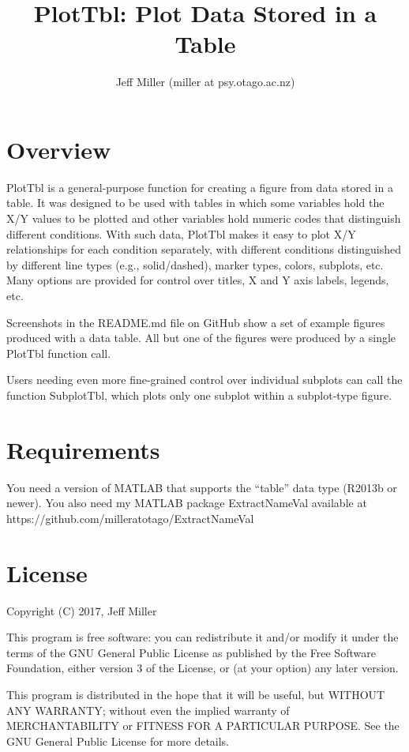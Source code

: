 \documentclass{article}
\title{PlotTbl: Plot Data Stored in a Table}
\author{Jeff Miller (miller at psy.otago.ac.nz)}
\begin{document}
\maketitle
\tableofcontents

\section{Overview}

PlotTbl is a general-purpose function for creating a figure from data stored in a table.
It was designed to be used with tables in which some variables hold the X/Y values to be plotted and
other variables hold numeric codes that distinguish different conditions.
With such data, PlotTbl makes it easy to plot X/Y relationships for each condition
separately, with different conditions distinguished by
different line types (e.g., solid/dashed), marker types, colors, subplots, etc.
Many options are provided for control over titles, X and Y axis labels, legends, etc.

Screenshots in the README.md file on GitHub show a set of example figures produced with a data table.
All but one of the figures were produced by a single PlotTbl function call.

Users needing even more fine-grained control over individual subplots can call the
function SubplotTbl, which plots only one subplot within a subplot-type figure.

\section{Requirements}

You need a version of MATLAB that supports the ``table'' data type (R2013b or newer).
You also need my MATLAB package ExtractNameVal available at
https://github.com/milleratotago/ExtractNameVal


\section{License}

Copyright (C) 2017, Jeff Miller

This program is free software: you can redistribute it and/or modify
it under the terms of the GNU General Public License as published by
the Free Software Foundation, either version 3 of the License, or
(at your option) any later version.

This program is distributed in the hope that it will be useful,
but WITHOUT ANY WARRANTY; without even the implied warranty of
MERCHANTABILITY or FITNESS FOR A PARTICULAR PURPOSE.  See the
GNU General Public License for more details.
\end{document}
